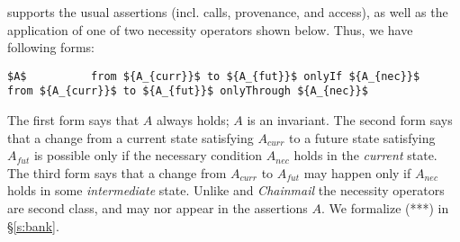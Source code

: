  

\Chainspec supports the usual assertions (incl. calls, provenance,
and access), as well as the application of one of two necessity operators shown below.
Thus, we  have %
 following forms:
\begin{lstlisting}[mathescape=true, language=chainmail, frame=lines]
       $A$          from ${A_{curr}}$ to ${A_{fut}}$ onlyIf ${A_{nec}}$          from ${A_{curr}}$ to ${A_{fut}}$ onlyThrough ${A_{nec}}$
\end{lstlisting}
%
The first form says that $A$ always holds;  $A$ is an invariant.
The second form says that  a change from a current state satisfying $A_{curr}$ to a future
state satisfying $A_{fut}$ %
is possible only if the necessary condition
$A_{nec}$ holds in the \emph{current} state.
The third form says that a change from %
$A_{curr}$ to %
$A_{fut}$  may happen only if %
$A_{nec}$ holds in some \emph{intermediate} state.
Unlike  {} and  \emph{Chainmail} 
 the necessity operators %
 are second class, and may nor appear in the assertions $A$.
We formalize (***) %
in  \S\ref{s:bank}.


 
